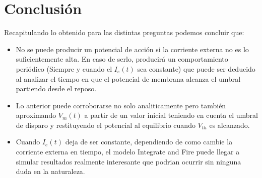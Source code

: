 \documentclass[10pt,journal,compsoc]{IEEEtran}
\begin{document}
\section{Conclusión}
Recapitulando lo obtenido para las distintas preguntas podemos concluir que:
\begin{itemize}
  \item No se puede producir un potencial de acción si la corriente externa no
  es lo suficientemente alta. En caso de serlo, producirá un comportamiento
  periódico (Siempre y cuando el $I_e(t)$ sea constante) que puede ser deducido al
  analizar el tiempo en que el potencial de membrana alcanza el umbral partiendo
  desde el reposo.
  \item Lo anterior puede corroborarse no solo analiticamente pero también
  aproximando $V_m(t)$ a partir de un valor inicial teniendo en cuenta el umbral
  de disparo y restituyendo el potencial al equilibrio cuando $V_{th}$ es
  alcanzado.
  \item Cuando $I_e(t)$ deja de ser constante, dependiendo de como cambie la
  corriente externa en tiempo, el modelo Integrate and Fire puede llegar a
  simular resultados realmente interesante que podrian ocurrir sin ninguna duda
  en la naturaleza.
\end{itemize}
%
%
%
%

%
%
\end{document}
